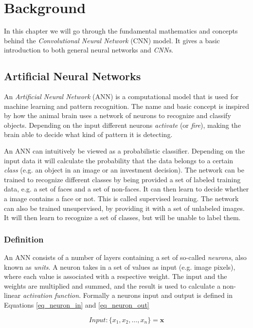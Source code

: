 \chapter{Background}

In this chapter we will go through the fundamental mathematics and concepts behind the \textit{Convolutional Neural Network} (CNN) model. It gives a basic introduction to both general neural networks and \textit{CNNs}.

\section{Artificial Neural Networks}\label{ann}

An \textit{Artificial Neural Network} (ANN) is a computational model that is used for machine learning and pattern recognition. The name and basic concept is inspired by how the animal brain uses a network of neurons to recognize and classify objects. Depending on the input different neurons \textit{activate} (or \textit{fire}), making the brain able to decide what kind of pattern it is detecting. 

An ANN can intuitively be viewed as a probabilistic classifier. Depending on the input data it will calculate the probability that the data belongs to a certain \textit{class} (e.g. an object in an image or an investment decision). The network can be trained to recognize different classes by being provided a set of labeled training data, e.g. a set of faces and a set of non-faces. It can then learn to decide whether a image contains a face or not. This is called supervised learning. The network can also be trained unsupervised, by providing it with a set of unlabeled images. It will then learn to recognize a set of classes, but will be unable to label them.  

\subsection{Definition} \hfill \break
An ANN  consists of a number of layers containing a set of so-called \textit{neurons}, also known as \textit{units}. A neuron takes in a set of values as input (e.g. image pixels), where each value is associated with a respective weight. The input and the weights are multiplied and summed, and the result is used to calculate a non-linear \textit{activation function}. Formally a neurons input and output is defined in Equations \ref{eq_neuron_in} and \ref{eq_neuron_out}


\begin{equation}\label{eq_neuron_in}
Input: \{x_1, x_2,\dots, x_n\} = \mathbf{x} 
\end{equation}

